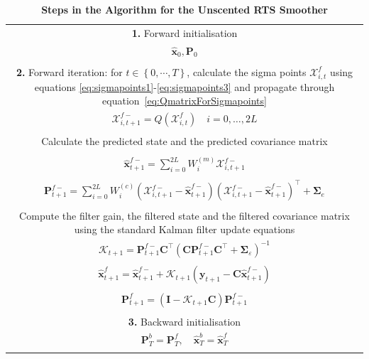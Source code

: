 \documentclass[10pt]{article}
\begin{document}
\begin{table}[!ht]
\caption{
\bf{Steps in the Algorithm for the Unscented RTS Smoother}}
\begin{tabular}{|c|}\hline
\multicolumn{1}{|p{16cm}|}{\textbf{1.} Forward initialisation} \\ 
$\hat{\mathbf x}_0, \mathbf P_0$ \\
\\ \hline
\multicolumn{1}{|p{16cm}|}{\textbf{2.} Forward iteration: for $t \in \left\lbrace 0,\cdots, T\right\rbrace $, calculate the sigma points $\mathcal X_{i,t}^f$ using equations \ref{eq:sigmapoints1}-\ref{eq:sigmapoints3} and propagate through equation~\ref{eq:QmatrixForSigmapoints}} \\
$\mathcal X_{i,t+1}^{f-}=Q(\mathcal X_{i,t}^f) \quad i=0, \dots, 2L$\\
\\
\multicolumn{1}{|p{16cm}|}{Calculate the predicted state and the predicted covariance matrix} \\
\\
$\hat{\mathbf x}_{t+1}^{f-}=\sum_{i=0}^{2L} W_i^{(m)}\mathcal X_{i,t+1}^{f-} $ \\
\\
$\mathbf P_{t +1}^{f-}=\sum_{i=0}^{2L} W_i^{(c)}(\mathcal X_{i,t+1}^{f-}-\hat{\mathbf x}_{t +1}^{f-})(\mathcal X_{i,t+1}^{f-}-\hat{\mathbf x}_{t +1}^{f-})^\top+\boldsymbol \Sigma_e$ \\ 
\\
\multicolumn{1}{|p{16cm}|}{Compute the filter gain, the filtered state and the filtered covariance matrix using the standard Kalman filter update equations} \\
$\mathcal K_{t+1}=\mathbf P_{t +1}^{f-}\mathbf C ^\top(\mathbf C \mathbf P_{t +1}^{f-}\mathbf C ^\top+\boldsymbol \Sigma_{\varepsilon})^{-1}$\\
\\
$\hat{\mathbf x}_{t+1}^{f}=\hat{\mathbf x}_{t+1}^{f-}+\mathcal K_{t+1}(\mathbf y_{t+1}-\mathbf C\hat{\mathbf x}_{t +1}^{f-}) $\\
\\
$\mathbf P_{t+1}^f=(\mathbf I - \mathcal K_{t+1}\mathbf C)\mathbf P_{t +1}^{f-}$\\ 
\\\hline
\multicolumn{1}{|p{16cm}|}{\textbf{3.} Backward initialisation}\\
$\mathbf P_T^b= \mathbf P_T^f, \quad \hat{\mathbf x}^b_T= \hat{\mathbf x}^f_T$ \\
\\\hline

\end{tabular}
\end{table}
\end{document}
